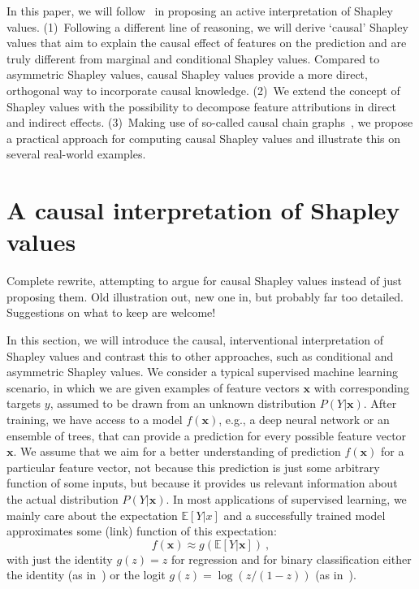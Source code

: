 \documentclass{article}
\newcommand{\vx}{\mathbf{x}}
\newcommand{\expectation}{\mathbb{E}}
\newcommand{\comment}[1]{{\color{red} #1}}
\begin{document}
In this paper, we will follow~\cite{janzing2019feature,lundberg2020local} in proposing an active interpretation of Shapley values. (1)~Following a different line of reasoning, we will derive `causal' Shapley values that aim to explain the causal effect of features on the prediction and are truly different from marginal and conditional Shapley values. Compared to asymmetric Shapley values, causal Shapley values provide a more direct, orthogonal way to incorporate causal knowledge. (2)~We extend the concept of Shapley values with the possibility to decompose feature attributions in direct and indirect effects. (3)~Making use of so-called causal chain graphs~\cite{lauritzen2002chain}, we propose a practical approach for computing causal Shapley values and illustrate this on several real-world examples.

\section{A causal interpretation of Shapley values}
\label{sec:interpretation}

\comment{Complete rewrite, attempting to argue for causal Shapley values instead of just proposing them. Old illustration out, new one in, but probably far too detailed. Suggestions on what to keep are welcome!}

In this section, we will introduce the causal, interventional interpretation of Shapley values and contrast this to other approaches, such as conditional and asymmetric Shapley values. We consider a typical supervised machine learning scenario, in which we are given examples of feature vectors $\vx$ with corresponding targets $y$, assumed to be drawn from an unknown distribution $P(Y|\vx)$. After training, we have access to a model $f(\vx)$, e.g., a deep neural network or an ensemble of trees, that can provide a prediction for every possible feature vector $\vx$. We assume that we aim for a better understanding of prediction $f(\vx)$ for a particular feature vector, not because this prediction is just some arbitrary function of some inputs, but because it provides us relevant information about the actual distribution $P(Y|\vx)$. In most applications of supervised learning, we mainly care about the expectation $\expectation[Y|x]$ and a successfully trained model approximates some (link) function of this expectation:
\[
f(\vx) \approx g(\expectation[Y|\vx]) \: ,
\]
with just the identity $g(z) = z$ for regression and for binary classification either the identity (as in~\cite{aas2019explaining}) or the logit $g(z) = \log (z/(1-z))$ (as in~\cite{lundberg2017unified}).
\end{document}

